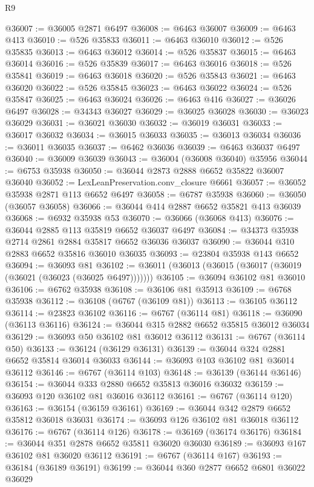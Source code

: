 \begin{lexlean}{R9}
\begin{coremodule}
@36007 := @36005 @2871 @6497
@36008 := @6463 @36007
@36009 := @6463 @413
@36010 := @526 @35833
@36011 := @6463 @36010
@36012 := @526 @35835
@36013 := @6463 @36012
@36014 := @526 @35837
@36015 := @6463 @36014
@36016 := @526 @35839
@36017 := @6463 @36016
@36018 := @526 @35841
@36019 := @6463 @36018
@36020 := @526 @35843
@36021 := @6463 @36020
@36022 := @526 @35845
@36023 := @6463 @36022
@36024 := @526 @35847
@36025 := @6463 @36024
@36026 := @6463 @416
@36027 := @36026 @6497
@36028 := @34343 @36027
@36029 := @36025 @36028
@36030 := @36023 @36029
@36031 := @36021 @36030
@36032 := @36019 @36031
@36033 := @36017 @36032
@36034 := @36015 @36033
@36035 := @36013 @36034
@36036 := @36011 @36035
@36037 := @6462 @36036
@36039 := @6463 @36037 @6497
@36040 := @36009 @36039
@36043 := @36004 (@36008 @36040) @35956
@36044 := @6753 @35938
@36050 := @36044 @2873 @2888 @6652 @35822 @36007 @36040
@36052 := LexLeanPreservation.conv_closure @6661
@36057 := @36052 @35938 @2871 @113 @6652 @6497
@36058 := @6787 @35938
@36060 := @36050 (@36057 @36058)
@36066 := @36044 @414 @2887 @6652 @35821 @413 @36039
@36068 := @6932 @35938 @53
@36070 := @36066 (@36068 @413)
@36076 := @36044 @2885 @113 @35819 @6652 @36037 @6497
@36084 := @34373 @35938 @2714 @2861 @2884 @35817 @6652 @36036 @36037
@36090 := @36044 @310 @2883 @6652 @35816 @36010 @36035
@36093 := @23804 @35938 @143 @6652
@36094 := @36093 @81
@36102 := @36011 (@36013 (@36015 (@36017 (@36019 (@36021 (@36023 (@36025 @6497)))))))
@36105 := @36094 @36102 @81 @36010
@36106 := @6762 @35938
@36108 := @36106 @81 @35913
@36109 := @6768 @35938
@36112 := @36108 (@6767 (@36109 @81))
@36113 := @36105 @36112
@36114 := @23823 @36102
@36116 := @6767 (@36114 @81)
@36118 := @36090 (@36113 @36116)
@36124 := @36044 @315 @2882 @6652 @35815 @36012 @36034
@36129 := @36093 @50 @36102 @81 @36012 @36112
@36131 := @6767 (@36114 @50)
@36133 := @36124 (@36129 @36131)
@36139 := @36044 @324 @2881 @6652 @35814 @36014 @36033
@36144 := @36093 @103 @36102 @81 @36014 @36112
@36146 := @6767 (@36114 @103)
@36148 := @36139 (@36144 @36146)
@36154 := @36044 @333 @2880 @6652 @35813 @36016 @36032
@36159 := @36093 @120 @36102 @81 @36016 @36112
@36161 := @6767 (@36114 @120)
@36163 := @36154 (@36159 @36161)
@36169 := @36044 @342 @2879 @6652 @35812 @36018 @36031
@36174 := @36093 @126 @36102 @81 @36018 @36112
@36176 := @6767 (@36114 @126)
@36178 := @36169 (@36174 @36176)
@36184 := @36044 @351 @2878 @6652 @35811 @36020 @36030
@36189 := @36093 @167 @36102 @81 @36020 @36112
@36191 := @6767 (@36114 @167)
@36193 := @36184 (@36189 @36191)
@36199 := @36044 @360 @2877 @6652 @6801 @36022 @36029

\end{coremodule}
\end{lexlean}
